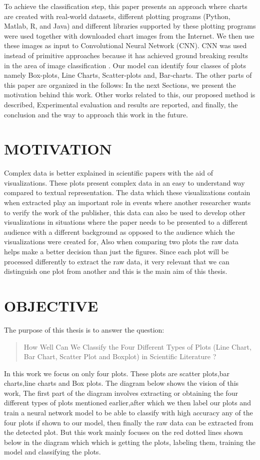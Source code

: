 \documentclass[12pt, a4paper,oneside]{report}
\begin{document}
To achieve the classification step, this paper presents an approach where charts are created with real-world datasets, different plotting programs (Python, Matlab, R, and Java) and different libraries supported by these plotting programs were used together with downloaded chart images from the Internet. We then use these images as input to Convolutional Neural Network (CNN). CNN was used instead of primitive approaches because it has achieved ground breaking results in the area of image classification \cite{amara2017convolutional}. Our model can identify four classes of plots namely Box-plots, Line Charts, Scatter-plots and, Bar-charts.
The other parts of this paper are organized in the follows: 
In the next Sections, we present the motivation behind this work. Other works related to this,  our proposed method is described,
Experimental evaluation and results are reported, and finally, the conclusion and the way to approach this work in the future.

\section{MOTIVATION}
Complex data is better explained in scientific papers with the aid of visualizations. These plots present complex data in an easy to understand way compared to textual representation. The data which these visualizations contain when extracted play an important role in events where another researcher wants to verify the work of the publisher, this data can also be used to develop other visualizations in situations where the paper needs to be presented to a different audience with a different background as opposed to the audience which the visualizations were created for, Also when comparing two plots the raw data helps make a better decision than just the figures. Since each plot will be processed differently to extract the raw data, it very relevant that we can distinguish one plot from another and this is the main aim of this thesis. 

\section{OBJECTIVE}
The purpose of this thesis is to answer the question: \begin{quote} How Well Can We Classify the Four Different Types of Plots (Line Chart, Bar Chart, Scatter Plot and Boxplot) in Scientific Literature ? \end{quote} In this work we focus on only four plots. These plots are scatter plots,bar charts,line charts and Box plots. The diagram below shows the vision of this work, The first part of the diagram involves extracting or obtaining  the four different types of plots mentioned earlier,after which we then label our plots and train a neural network model to be able to classify with high accuracy any of the four plots if shown to our model, then finally the raw data can be extracted from the detected plot.
But this work mainly focuses on the red dotted lines shown below in the diagram which which is getting the plots, labeling them, training the model and classifying the plots. \\
 
\end{document}
